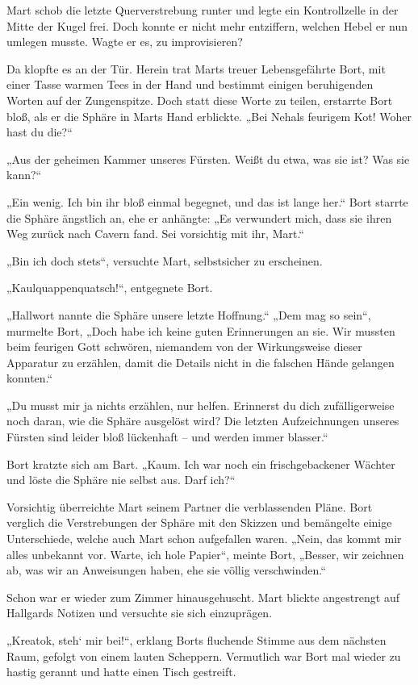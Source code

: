 Mart schob die letzte Querverstrebung runter und legte ein Kontrollzelle in der Mitte der Kugel frei. Doch konnte er nicht mehr entziffern, welchen Hebel er nun umlegen musste. Wagte er es, zu improvisieren?

Da klopfte es an der Tür. Herein trat Marts treuer Lebensgefährte Bort, mit einer Tasse warmen Tees in der Hand und bestimmt einigen beruhigenden Worten auf der Zungenspitze. Doch statt diese Worte zu teilen, erstarrte Bort bloß, als er die Sphäre in Marts Hand erblickte.
„Bei Nehals feurigem Kot! Woher hast du die?“

„Aus der geheimen Kammer unseres Fürsten. Weißt du etwa, was sie ist? Was sie kann?“

„Ein wenig. Ich bin ihr bloß einmal begegnet, und das ist lange her.“ Bort starrte die Sphäre ängstlich an, ehe er anhängte: „Es verwundert mich, dass sie ihren Weg zurück nach Cavern fand. Sei vorsichtig mit ihr, Mart.“

„Bin ich doch stets“, versuchte Mart, selbstsicher zu erscheinen.

„Kaulquappenquatsch!“, entgegnete Bort. 

„Hallwort nannte die Sphäre unsere letzte Hoffnung.“ „Dem mag so sein“, murmelte Bort, „Doch habe ich keine guten Erinnerungen an sie. Wir mussten beim feurigen Gott schwören, niemandem von der Wirkungsweise dieser Apparatur zu erzählen, damit die Details nicht in die falschen Hände gelangen konnten.“

„Du musst mir ja nichts erzählen, nur helfen. Erinnerst du dich zufälligerweise noch daran, wie die Sphäre ausgelöst wird? Die letzten Aufzeichnungen unseres Fürsten sind leider bloß lückenhaft – und werden immer blasser.“

Bort kratzte sich am Bart. „Kaum. Ich war noch ein frischgebackener Wächter und löste die Sphäre nie selbst aus. Darf ich?“

Vorsichtig überreichte Mart seinem Partner die verblassenden Pläne. Bort verglich die Verstrebungen der Sphäre mit den Skizzen und bemängelte einige Unterschiede, welche auch Mart schon aufgefallen waren. „Nein, das kommt mir alles unbekannt vor. Warte, ich hole Papier“, meinte Bort, „Besser, wir zeichnen ab, was wir an Anweisungen haben, ehe sie völlig verschwinden.“

Schon war er wieder zum Zimmer hinausgehuscht. Mart blickte angestrengt auf Hallgards Notizen und versuchte sie sich einzuprägen.

„Kreatok, steh‘ mir bei!“, erklang Borts fluchende Stimme aus dem nächsten Raum, gefolgt von einem lauten Scheppern. Vermutlich war Bort mal wieder zu hastig gerannt und hatte einen Tisch gestreift. 

